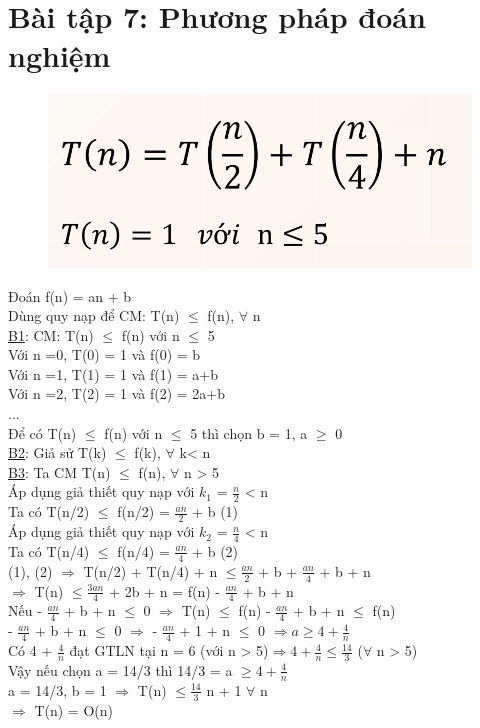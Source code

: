 \documentclass[10pt,a4paper]{article}
\begin{document}
\section*{Bài tập 7: Phương pháp đoán nghiệm} 
\begin{figure}[H]
    \centering
    \includegraphics[scale=.7]{images/7.png}
    \label{fig:my_label}
\end{figure}
Đoán f(n) = an + b \\
Dùng quy nạp để CM: T(n) $\leq$ f(n), $\forall$ n \\
\underline{B1}: CM: T(n) $\leq$ f(n) với n $\leq$ 5 \\
Với n =0, T(0) = 1 và f(0) = b \\
Với n =1, T(1) = 1 và f(1) = a+b \\
Với n =2, T(2) = 1 và f(2) = 2a+b\\
...\\
Để có T(n) $\leq$ f(n) với n $\leq$ 5 thì chọn b = 1, a $\geq$ 0\\
\underline{B2}: Giả sử T(k) $\leq$ f(k), $\forall$ k< n \\
\underline{B3}: Ta CM T(n) $\leq$ f(n), $\forall$ n > 5\\
Áp dụng giả thiết quy nạp với $k_1$ = $\frac{n}{2}$ < n\\
Ta có T(n/2) $\leq$ f(n/2) = $\frac{an}{2}$ + b (1)\\
Áp dụng giả thiết quy nạp với $k_2$ = $\frac{n}{4}$ < n \\
Ta có T(n/4) $\leq$ f(n/4) = $\frac{an}{4}$ + b (2)\\
(1), (2) $\Rightarrow$ T(n/2) + T(n/4) + n $\leq \frac{an}{2}$ + b + $\frac{an}{4}$ + b + n \\
$\Rightarrow$ T(n) $\leq \frac{3an}{4}$ + 2b + n = f(n) - $\frac{an}{4}$ + b + n\\
Nếu - $\frac{an}{4}$ + b + n $\leq$ 0 $\Rightarrow$ T(n) $\leq$ f(n) - $\frac{an}{4}$ + b + n $\leq$ f(n) \\
 - $\frac{an}{4}$ + b + n $\leq$ 0 $\Rightarrow$ - $\frac{an}{4}$ + 1 + n $\leq$ 0 $\Rightarrow a \geq 4 + \frac{4}{n}$ \\
 Có 4 + $\frac{4}{n}$ đạt GTLN tại n = 6 (với n > 5)$\Rightarrow 4 + \frac{4}{n} \leq \frac{14}{3}$ ($\forall$ n > 5)\\
 Vậy nếu chọn a = 14/3 thì 14/3 = a $\geq 4 + \frac{4}{n}$ \\
 a = 14/3, b = 1 $\Rightarrow$ T(n) $\leq \frac{14}{3}$ n + 1 $\forall$ n \\
  $\Rightarrow$ T(n) = O(n)
\end{document}
